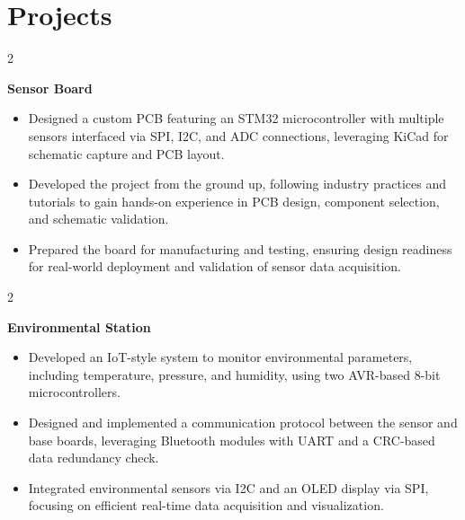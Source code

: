 \documentclass[10pt, a4paper]{article}
\newenvironment{highlights}{
    \begin{itemize}[
        topsep=0.1 cm,
        parsep=0.1 cm,
        partopsep=0pt,
        itemsep=0pt,
        leftmargin=0 cm + 10pt
    ]
}{
    \end{itemize}
} %
\newenvironment{twocolentry}[2][]{
    \onecolentry
    \def\secondColumn{#2}
    \setcolumnwidth{\fill, 3.5 cm}
    \begin{paracol}{2}
}{
    \switchcolumn \raggedleft \secondColumn
    \end{paracol}
    \endonecolentry
} %
\let\hrefWithoutArrow\href
\renewcommand{\href}[2]{\hrefWithoutArrow{#1}{\ifthenelse{\equal{#2}{}}{ }{#2 }\raisebox{.15ex}{\footnotesize \faExternalLink*}}}
\begin{document}
    
    \section{Projects}



        
        \begin{twocolentry}{
            \href{https://github.com/cristiancristea00/sensor-board}{GitHub}
        }
            \textbf{Sensor Board}
            \begin{highlights}
                \item Designed a custom PCB featuring an STM32 microcontroller with multiple sensors interfaced via SPI, I2C, and ADC connections, leveraging KiCad for schematic capture and PCB layout.
                \item Developed the project from the ground up, following industry practices and tutorials to gain hands-on experience in PCB design, component selection, and schematic validation.
                \item Prepared the board for manufacturing and testing, ensuring design readiness for real-world deployment and validation of sensor data acquisition.
            \end{highlights}
        \end{twocolentry}


        \vspace{0.2 cm}

        \begin{twocolentry}{
            \href{https://github.com/cristiancristea00/environmental-station}{GitHub}
        }
            \textbf{Environmental Station}
            \begin{highlights}
                \item Developed an IoT-style system to monitor environmental parameters, including temperature, pressure, and humidity, using two AVR-based 8-bit microcontrollers.
                \item Designed and implemented a communication protocol between the sensor and base boards, leveraging Bluetooth modules with UART and a CRC-based data redundancy check.
                \item Integrated environmental sensors via I2C and an OLED display via SPI, focusing on efficient real-time data acquisition and visualization.
            \end{highlights}
        \end{twocolentry}
\end{document}
